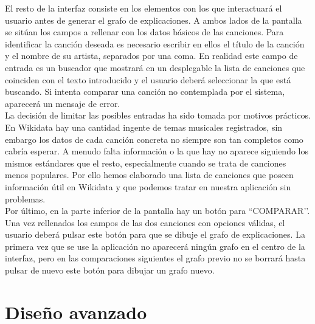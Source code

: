El resto de la interfaz consiste en los elementos con los que interactuará el usuario antes de generar el grafo de explicaciones. A ambos lados de la pantalla se sitúan los campos a rellenar con los datos básicos de las canciones. Para identificar la canción deseada es necesario escribir en ellos el título de la canción y el nombre de su artista, separados por una coma. En realidad este campo de entrada es un buscador que mostrará en un desplegable la lista de canciones que coinciden con el texto introducido y el usuario deberá seleccionar la que está buscando. Si intenta comparar una canción no contemplada por el sistema, aparecerá un mensaje de error.\\

La decisión de limitar las posibles entradas ha sido tomada por motivos prácticos. En Wikidata hay una cantidad ingente de temas musicales registrados, sin embargo los datos de cada canción concreta no siempre son tan completos como cabría esperar. A menudo falta información o la que hay no aparece siguiendo los mismos estándares que el resto, especialmente cuando se trata de canciones menos populares. Por ello hemos elaborado una lista de canciones que poseen información útil en Wikidata y que podemos tratar en nuestra aplicación sin problemas.\\

Por último, en la parte inferior de la pantalla hay un botón para ``COMPARAR’’. Una vez rellenados los campos de las dos canciones con opciones válidas, el usuario deberá pulsar este botón para que se dibuje el grafo de explicaciones. La primera vez que se use la aplicación no aparecerá ningún grafo en el centro de la interfaz, pero en las comparaciones siguientes el grafo previo no se borrará hasta pulsar de nuevo este botón para dibujar un grafo nuevo.\\

\section{Diseño avanzado}

